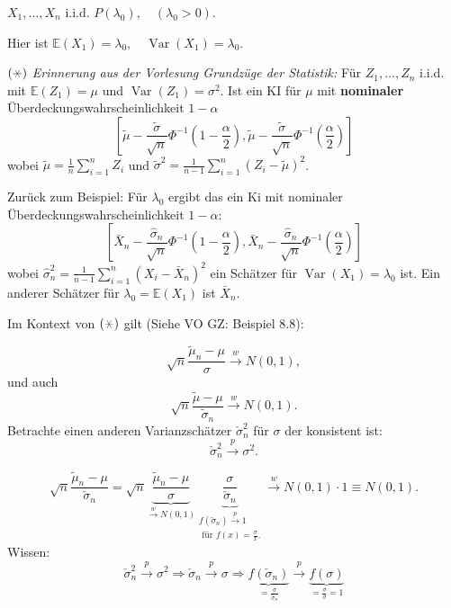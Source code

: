 \documentclass{tstextbook}
\DeclareMathOperator{\Var}{Var}
\newcommand{\E}{\mathbb E}
\begin{document}
\begin{example}
	$ X_1,\ldots,X_n $ i.i.d. $ P(\lambda_0), \quad (\lambda_0 > 0) $. 
	
	Hier ist $ \E(X_1)=\lambda_0, \quad \Var(X_1)=\lambda_0 $. 
	
	
	$ (\hexstar) $ \textit{Erinnerung aus der Vorlesung Grundzüge der Statistik:} 
	Für $ Z_1,\ldots, Z_n $ i.i.d. mit $ \E(Z_1) = \mu $ und $ \Var(Z_1) = \sigma^2 $. Ist ein KI für $ \mu $ mit \textbf{nominaler}  Überdeckungswahrscheinlichkeit $ 1 - \alpha $ 
	\[
	\left[\tilde{\mu} - \frac{\tilde{\sigma}}{\sqrt{n}} \Phi^{-1}\left(1-\frac{\alpha}{2}\right), \tilde{\mu} - \frac{\tilde{\sigma}}{\sqrt{n}} \Phi^{-1}\left(\frac{\alpha}{2}\right) \right]
	\]
	wobei $ \tilde{\mu}= \frac{1}{n}\sum_{i=1}^{n} Z_i $ und $ \tilde{\sigma}^2 = \frac{1}{n-1} \sum_{i=1}^{n} (Z_i - \tilde{\mu})^2 $.
	
	Zurück zum Beispiel: Für $ \lambda_0 $ ergibt das ein Ki mit nominaler Überdeckungswahrscheinlichkeit $ 1 - \alpha $: 
	\[
	\left[\bar{X}_n - \frac{\hat{\sigma}_n}{\sqrt{n}} \Phi^{-1}\left(1-\frac{\alpha}{2}\right), \bar{X}_n - \frac{\hat{\sigma}_n}{\sqrt{n}} \Phi^{-1}\left(\frac{\alpha}{2}\right) \right]
	\]
	wobei $ \hat{\sigma}_n^2 = \frac{1}{n-1} \sum_{i=1}^{n} (X_i - \bar{X}_n)^2 $ ein Schätzer für $ \Var(X_1) = \lambda_0 $ ist. Ein anderer Schätzer für $ \lambda_0 = \E(X_1) $ ist $ \bar{X}_n $.
	
	
	Im Kontext von $ (\hexstar) $ gilt (Siehe VO GZ: Beispiel 8.8): 
	
	\[
	\sqrt{n} \frac{\tilde{\mu}_n-\mu}{\sigma} \overset{w}{\longrightarrow} N(0,1), 
	\] und auch
	\[
	\sqrt{n} \frac{\tilde{\mu}-\mu}{\tilde{\sigma}_n} \overset{w}{\longrightarrow} N(0,1). 
	\]
	Betrachte einen anderen Varianzschätzer $ \check{\sigma}_n^2 $ für $ \sigma $ der konsistent ist: \[ \check{\sigma}_n^2 \xrightarrow{p} \sigma^2 . \]
	
	\[
	\sqrt{n} \frac{\tilde{\mu}_n - \mu}{\check{\sigma}_n} = \sqrt{n} \underbrace{\frac{\tilde{\mu}_n - \mu}{\sigma}}_{\xrightarrow{w}N(0,1)} \underbrace{\frac{\sigma}{\check{\sigma}_n}}_{\substack{ f(\check{\sigma}_n) \xrightarrow{p}1 \\ \text{ für } f(x) = \frac{\sigma}{x}.}} \xrightarrow{w} N(0,1)\cdot 1 \equiv N(0,1).
	\]
	Wissen: \[ \check{\sigma}_n^2 \xrightarrow{p} \sigma^2 \Rightarrow \check{\sigma}_n \xrightarrow{p} \sigma \Rightarrow \underbrace{f(\check{\sigma}_n)}_{=\frac{\sigma}{\check{\sigma}_n}} \xrightarrow{p} \underbrace{f(\sigma)}_{= \frac{\sigma}{\sigma}=1} \]
	

\end{example}
\end{document}
